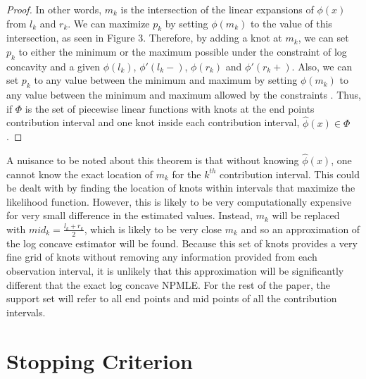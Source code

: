 \documentclass[10pt]{article}
\begin{document}
\begin{proof}
	
	In other words, $m_k$ is the intersection of the linear expansions of $\phi(x)$ from $l_k$ and $r_k$. We can maximize $p_k$ by setting $\phi(m_k)$ to the value of this intersection, as seen in Figure 3. Therefore, by adding a knot at $m_k$, we can set $p_k$ to either the minimum or the maximum possible under the constraint of log concavity and a given $\phi(l_k)$, $\phi'(l_k -)$, $\phi(r_k)$ and $\phi'(r_k+)$. Also, we can set $p_k$ to any value between the minimum and maximum by setting $\phi(m_k)$ to any value between the minimum and maximum allowed by the constraints . Thus, if $\Phi$ is the set of piecewise linear functions with knots at the end points contribution interval and one knot inside each contribution interval, $\hat\phi(x) \in \Phi$. 
	
	\end{proof}
	
	A nuisance to be noted about this theorem is that without knowing $\hat\phi(x)$, one cannot know the exact location of $m_k$ for the $k^{th}$ contribution interval. This could be dealt with by finding the location of knots within intervals that maximize the likelihood function. However, this is likely to be very computationally expensive for very small difference in the estimated values. Instead, $m_k$ will be replaced with $mid_k = \frac{l_k + r_k}{2}$, which is likely to be very close $m_k$ and so an approximation of the log concave estimator will be found. Because this set of knots provides a very fine grid of knots without removing any information provided from each observation interval, it is unlikely that this approximation will be significantly different that the exact log concave NPMLE. For the rest of the paper, the support set will refer to all end points and mid points of all the contribution intervals.

	
	{\section{Stopping Criterion} } 
	
\end{document}
